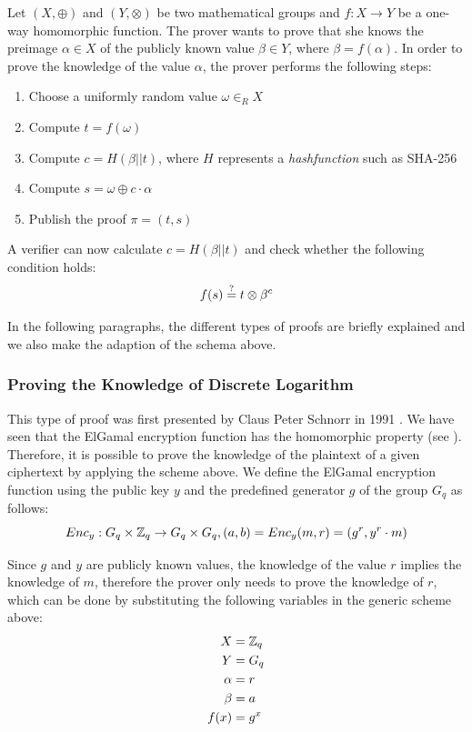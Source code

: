 \documentclass[numbers=noenddot, abstract=on, a4paper, headsepline,
footsepline, oneside, draft=off]{scrreprt}
\newcommand{\myref}[1]{(see \Vref{#1})}
\begin{document}
Let $(X,\oplus)$ and $(Y,\otimes)$ be two mathematical groups and
$f:X \rightarrow Y$ be a one-way homomorphic function. The prover wants to prove
that she knows the preimage $\alpha \in X$ of the publicly known value $\beta \in
Y$, where $\beta=f(\alpha)$. In order to prove the knowledge of the value
$\alpha$, the prover performs the following steps:
\begin{enumerate}
  \item Choose a uniformly random value $\omega \in_R X$
  \item Compute $t=f(\omega)$
  \item Compute $c=H(\beta||t)$, where $H$ represents a \emph{hashfunction} such
  as SHA-256
  \item Compute $s=\omega \oplus c \cdot \alpha$
  \item Publish the proof $\pi = (t,s)$
\end{enumerate}

A verifier can now calculate $c=H(\beta||t)$ and check whether the following
condition holds:
\begin{equation}
	f(s) \stackrel{?}{=} t \otimes \beta^c \notag
\end{equation}

 In the following paragraphs, the different types of proofs are briefly
 explained and we also make the adaption of the schema above.
 
\subsubsection{Proving the Knowledge of Discrete Logarithm}
\label{sec:proofknowledgedlog}
This type of proof was first presented by Claus Peter Schnorr in 1991
\cite{Schnorr91}. We have seen that the ElGamal encryption function has the
homomorphic property \myref{sec:homenc}. Therefore, it is possible to prove the
knowledge of the plaintext of a given ciphertext by applying the scheme above.
We define the ElGamal encryption function using the public key $y$ and the
predefined generator $g$ of the group $G_q$ as follows:
\begin{equation}
	Enc_y:G_q \times \mathbb{Z}_q \rightarrow G_q \times G_q, (a,b) = Enc_y(m,
	r)=(g^r, y^r \cdot m) \notag
\end{equation} 

Since $g$ and $y$ are publicly known values, the knowledge of the value $r$
implies the knowledge of $m$, therefore the prover only needs to prove the
knowledge of $r$, which can be done by substituting the following variables in
the generic scheme above:
\begin{align}
  X &= \mathbb{Z}_q \notag \\
  Y &= G_q \notag \\
  \alpha &=r \notag \\
  \beta &=a \notag \\
  f(x) &= g^x \notag
\end{align} 
\end{document}
